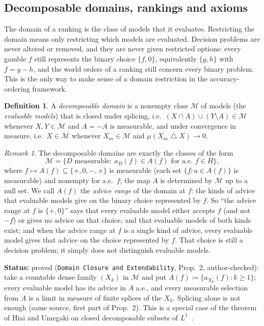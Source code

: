 \documentclass[11pt]{article}
\theoremstyle{definition}
\newtheorem{definition}[theorem]{Definition}
\theoremstyle{remark}
\newtheorem{remark}[theorem]{Remark}
\newcommand{\M}{\mathcal M}
\newcommand{\sd}{\mathbin{\triangle}}
\newcommand{\src}[1]{\texttt{#1}}
\newcommand{\status}[1]{\par\smallskip\noindent\textbf{Status:} #1\par\smallskip}
\begin{document}
\subsection{Decomposable domains, rankings and axioms}
The domain of a ranking is the class of models that it evaluates. Restricting the domain means only restricting which models are evaluated. Decision problems are never altered or removed, and they are never given restricted options: every gamble $f$ still represents the binary choice $\{f,0\}$, equivalently $\{g,h\}$ with $f=g-h$, and the world orders of a ranking still concern every binary problem. This is the only way to make sense of a domain restriction in the accuracy-ordering framework.

\begin{definition}\label{def:domain}
A \emph{decomposable domain} is a nonempty class $\M$ of models (the \emph{evaluable models}) that is closed under splicing, i.e.\ $(X\cap A)\cup(Y\setminus A)\in\M$ whenever $X,Y\in\M$ and $A=-A$ is measurable, and under convergence in measure, i.e.\ $X\in\M$ whenever $X_m\in\M$ and $\mu(X_m\sd X)\to0$.
\end{definition}

\begin{remark}\label{rem:advicerange}
The decomposable domains are exactly the classes of the form
\[
\M=\{D\text{ measurable}:\ a_D(f)\in A(f)\text{ for a.e.\ }f\in H\},
\]
where $f\mapsto A(f)\subseteq\{+,0,-,\times\}$ is measurable (each set $\{f:a\in A(f)\}$ is measurable) and nonempty for a.e.\ $f$; the map $A$ is determined by $\M$ up to a null set. We call $A(f)$ the \emph{advice range} of the domain at $f$: the kinds of advice that evaluable models give on the binary choice represented by $f$. So ``the advice range at $f$ is $\{+,0\}$'' says that every evaluable model either accepts $f$ (and not $-f$) or gives no advice on that choice, and that evaluable models of both kinds exist; and when the advice range at $f$ is a single kind of advice, every evaluable model gives that advice on the choice represented by $f$. That choice is still a decision problem; it simply does not distinguish evaluable models.
\end{remark}
\status{proved (\src{Domain Closure and Extendability}, Prop.~2, author-checked): take a countable dense family $(X_k)$ in $\M$ and put $A(f)\coloneqq\{a_{X_k}(f):k\ge1\}$; every evaluable model has its advice in $A$ a.e., and every measurable selection from $A$ is a limit in measure of finite splices of the $X_k$. Splicing alone is not enough (same source, first part of Prop.~2). This is a special case of the theorem of Hiai and Umegaki on closed decomposable subsets of $L^1$~\cite{HU1977}.}
\end{document}
